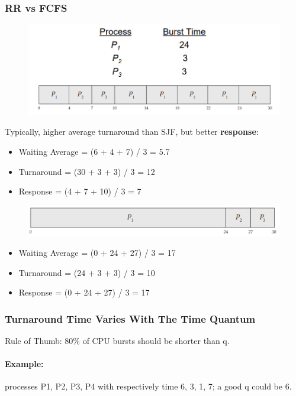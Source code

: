 \subsubsection{RR vs FCFS}


\begin{figure}[htbp]
    \centering
    \includegraphics[width=0.6\linewidth]{img/RR.png}    
    
\end{figure}

Typically, higher average turnaround than SJF, but better \textbf{response}:
\begin{itemize}
    \item[] Waiting Average = (6 + 4 + 7) / 3 = 5.7
    \item[] Turnaround = (30 + 3 + 3) / 3 = 12
    \item[] Response = (4 + 7 + 10) / 3 = 7 
\end{itemize}

\begin{figure}[htbp]
    \centering
    \includegraphics[width=0.6\linewidth]{img/FSCS_VSR.png}   
    
\end{figure}

\begin{itemize}
    \item[] Waiting Average =  (0 + 24 + 27) / 3 = 17
    \item[] Turnaround =  (24 + 3 + 3) / 3 = 10
    \item[] Response = (0 + 24 + 27) / 3 = 17 
\end{itemize}

\subsubsection{Turnaround Time Varies With The Time Quantum}

Rule of Thumb: 80\% of CPU bursts should be shorter than q.

\paragraph{Example: } processes P1, P2, P3, P4 with respectively time 6, 3, 1, 7; a good q could be 6.

